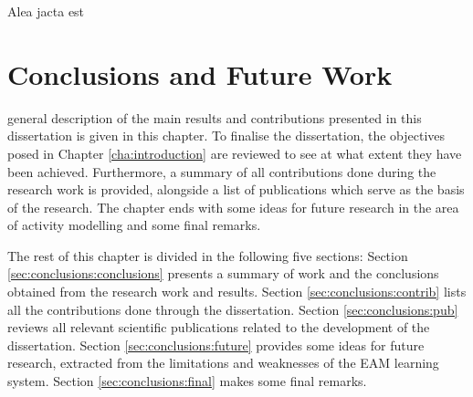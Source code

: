

\begin{savequote}[50mm]
Alea jacta est
\end{savequote}


\chapter{Conclusions and Future Work}
\label{cha:conclusions}

\ifpdf
    \graphicspath{{7_conclusions/figures/PDF/}{7_conclusions/figures/PNG/}{7_conclusions/figures/}}
\else
    \graphicspath{{7_conclusions/figures/EPS/}{7_conclusions/figures/}}
\fi

 general description of the main results and contributions presented in this dissertation is given in this chapter. To finalise the dissertation, the objectives posed in Chapter \ref{cha:introduction} are reviewed to see at what extent they have been achieved. Furthermore, a summary of all contributions done during the research work is provided, alongside a list of publications which serve as the basis of the research. The chapter ends with some ideas for future research in the area of activity modelling and some final remarks.

The rest of this chapter is divided in the following five sections: Section \ref{sec:conclusions:conclusions} presents a summary of work and the conclusions obtained from the research work and results. Section \ref{sec:conclusions:contrib} lists all the contributions done through the dissertation. Section \ref{sec:conclusions:pub} reviews all relevant scientific publications related to the development of the dissertation. Section \ref{sec:conclusions:future} provides some ideas for future research, extracted from the limitations and weaknesses of the EAM learning system. Section \ref{sec:conclusions:final} makes some final remarks.